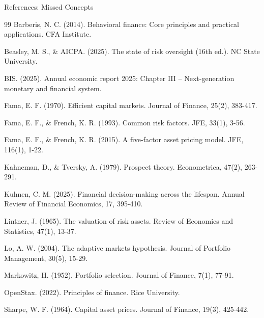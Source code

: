 \documentclass[aspectratio=169,10pt]{beamer}
\renewcommand{\tiny}{\fontsize{4pt}{5pt}\selectfont}
\begin{document}
	\begin{frame}{References: Missed Concepts}
		\tiny
		\begin{thebibliography}{99}
			 Barberis, N. C. (2014). Behavioral finance: Core principles and practical applications. CFA Institute.
			
			 Beasley, M. S., \& AICPA. (2025). The state of risk oversight (16th ed.). NC State University.
			
			 BIS. (2025). Annual economic report 2025: Chapter III – Next-generation monetary and financial system.
			
			 Fama, E. F. (1970). Efficient capital markets. Journal of Finance, 25(2), 383-417.
			
			 Fama, E. F., \& French, K. R. (1993). Common risk factors. JFE, 33(1), 3-56.
			
			 Fama, E. F., \& French, K. R. (2015). A five-factor asset pricing model. JFE, 116(1), 1-22.
			
			 Kahneman, D., \& Tversky, A. (1979). Prospect theory. Econometrica, 47(2), 263-291.
			
			 Kuhnen, C. M. (2025). Financial decision-making across the lifespan. Annual Review of Financial Economics, 17, 395-410.
			
			 Lintner, J. (1965). The valuation of risk assets. Review of Economics and Statistics, 47(1), 13-37.
			
			 Lo, A. W. (2004). The adaptive markets hypothesis. Journal of Portfolio Management, 30(5), 15-29.
			
			 Markowitz, H. (1952). Portfolio selection. Journal of Finance, 7(1), 77-91.
			
			 OpenStax. (2022). Principles of finance. Rice University.
			
			 Sharpe, W. F. (1964). Capital asset prices. Journal of Finance, 19(3), 425-442.
		\end{thebibliography}
	\end{frame}
	
	
\end{document}
